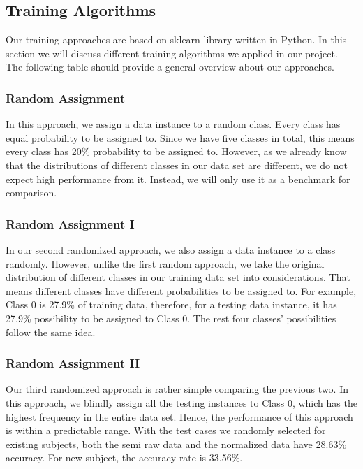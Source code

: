\documentclass{article} %
\begin{document}
\subsection{Training Algorithms}

Our training approaches are based on sklearn library written in Python. In this section we will discuss different training algorithms we applied in our project. The following table should provide a general overview about our approaches.

\subsubsection{Random Assignment}

In this approach, we assign a data instance to a random class. Every class has equal probability to be assigned to. Since we have five classes in total, this means every class has 20\% probability to be assigned to. However, as we already know that the distributions of different classes in our data set are different, we do not expect high performance from it. Instead, we will only use it as a benchmark for comparison.

\subsubsection{Random Assignment I}

In our second randomized approach, we also assign a data instance to a class randomly. However, unlike the first random approach, we take the original distribution of different classes in our training data set into considerations. That means different classes have different probabilities to be assigned to. For example, Class 0 is 27.9\% of  training data, therefore, for a testing data instance, it has 27.9\% possibility to be assigned to Class 0. The rest four classes’ possibilities follow the same idea.

\subsubsection{Random Assignment II}

Our third randomized approach is rather simple comparing the previous two. In this approach, we blindly assign all the testing instances to Class 0, which has the highest frequency in the entire data set. Hence, the performance of this approach is within a predictable range. With the test cases we randomly selected for existing subjects, both the semi raw data and the normalized data have 28.63\% accuracy. For new subject, the accuracy rate is 33.56\%.
\end{document}
